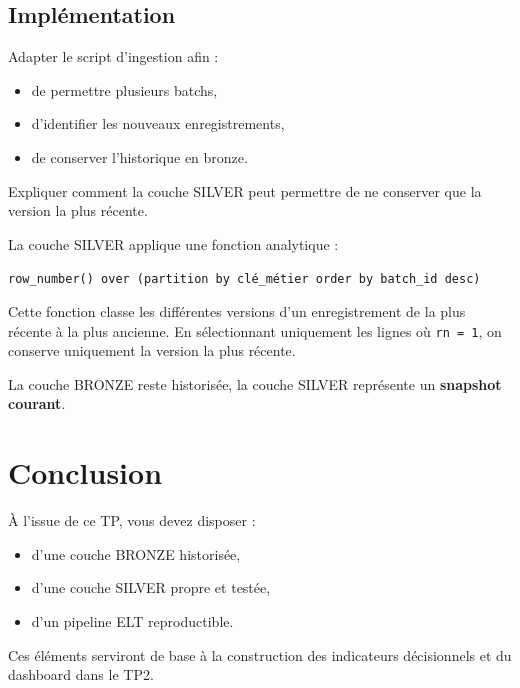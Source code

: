 \documentclass[11pt,a4paper]{article}
\begin{document}
\subsection*{Implémentation}

Adapter le script d’ingestion afin :

\begin{itemize}
  \item de permettre plusieurs batchs,
  \item d’identifier les nouveaux enregistrements,
  \item de conserver l’historique en bronze.
\end{itemize}

Expliquer comment la couche SILVER peut permettre de ne conserver que la version la plus récente.
  \begin{tcolorbox}[title=\textbf{Correction — Version la plus récente en SILVER}, colback=gray!5, colframe=black]
  La couche SILVER applique une fonction analytique :

  \begin{center}
  \texttt{row\_number() over (partition by clé\_métier order by batch\_id desc)}
  \end{center}

  Cette fonction classe les différentes versions d’un enregistrement
  de la plus récente à la plus ancienne.
  En sélectionnant uniquement les lignes où \texttt{rn = 1},
  on conserve uniquement la version la plus récente.

  La couche BRONZE reste historisée,
  la couche SILVER représente un \textbf{snapshot courant}.
  \end{tcolorbox}


\section*{Conclusion}

À l’issue de ce TP, vous devez disposer :

\begin{itemize}
  \item d’une couche BRONZE historisée,
  \item d’une couche SILVER propre et testée,
  \item d’un pipeline ELT reproductible.
\end{itemize}

Ces éléments serviront de base à la construction des indicateurs décisionnels
et du dashboard dans le TP2.
\end{document}
